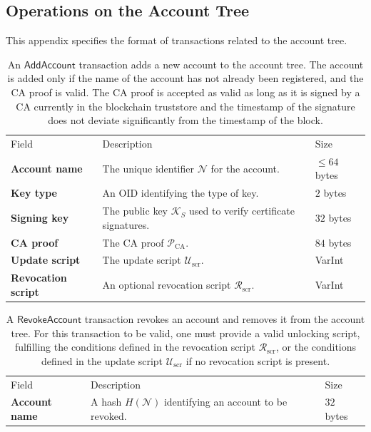 \documentclass{style/kththesis}
\begin{document}
\begin{appendices}
\chapter{Operations on the Account Tree}
\label{app:account-tree-transactions}
This appendix specifies the format of transactions related to the account tree.

\begin{table}[ht]
\caption{An $\mathsf{AddAccount}$ transaction adds a new account to the account tree. The account is added only if the name of the account has not already been registered, and the CA proof is valid. The CA proof is accepted as valid as long as it is signed by a CA currently in the blockchain truststore and the timestamp of the signature does not deviate significantly from the timestamp of the block.}
\label{tab:addaccount}
\begin{tabularx}{\textwidth}{lXl}
\cmidrule(r){1-3}
Field & Description & Size \\ 
\cmidrule(r){1-3}
\textbf{Account name} & The unique identifier $\mathcal{N}$ for the account. & $\le 64$ bytes \\
\textbf{Key type} & An OID identifying the type of key. & $2$ bytes \\
\textbf{Signing key} & The public key $\mathcal{K}_S$ used to verify certificate signatures. & $32$ bytes \\
\textbf{CA proof} & The CA proof $\mathcal{P}_{\text{CA}}$. & $84$ bytes \\
\textbf{Update script} & The update script $\mathcal{U}_{\text{scr}}$. & VarInt \\
\textbf{Revocation script} & An optional revocation script $\mathcal{R}_{\text{scr}}$. & VarInt
\end{tabularx}
\end{table}
\begin{table}[ht]
\caption{A $\mathsf{RevokeAccount}$ transaction revokes an account and removes it from the account tree. For this transaction to be valid, one must provide a valid unlocking script, fulfilling the conditions defined in the revocation script $\mathcal{R}_{\text{scr}}$, or the conditions defined in the update script $\mathcal{U}_{\text{scr}}$ if no revocation script is present.}
\label{tab:revokeaccount}
\begin{tabularx}{\textwidth}{lXl}
\cmidrule(r){1-3}
Field & Description & Size \\ 
\cmidrule(r){1-3}
\textbf{Account name} & A hash $H(\mathcal{N})$ identifying an account to be revoked. & $32$ bytes \\

\end{tabularx}
\end{table}
\end{appendices}
\end{document}
